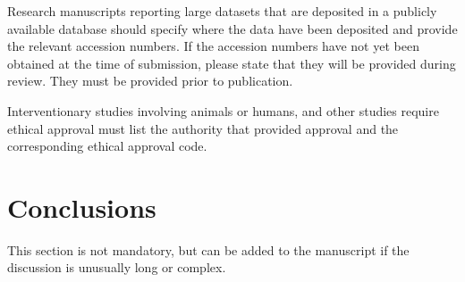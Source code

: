 \documentclass[entropy,article,submit,moreauthors,pdftex,10pt,a4paper]{mdpi}
\begin{document}
Research manuscripts reporting large datasets that are deposited in a publicly available database should specify where the data have been deposited and provide the relevant accession numbers. If the accession numbers have not yet been obtained at the time of submission, please state that they will be provided during review. They must be provided prior to publication.

Interventionary studies involving animals or humans, and other studies require ethical approval must list the authority that provided approval and the corresponding ethical approval code. 

\section{Conclusions}

This section is not mandatory, but can be added to the manuscript if the discussion is unusually long or complex.

\vspace{6pt} 






\appendix
\end{document}
